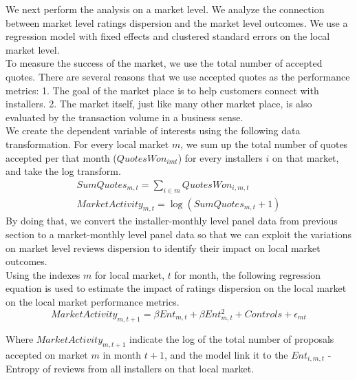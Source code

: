 \documentclass[msom,blindrev]{informs3}
\begin{document}
We next perform the analysis on a market level. We analyze the connection between market level ratings dispersion and the market level outcomes.  We use a regression model with fixed effects and clustered standard errors on the local market level. \\
To measure the success of the market, we use the total number of accepted quotes. There are several reasons that we use accepted quotes as the performance metrics: 1. The goal of the market place is to help customers connect with installers. 2. The market itself, just like many other market place, is also evaluated by the transaction volume in a business sense. \\
We create the dependent variable of interests using the following data transformation. For every local market $m$, we sum up the total number of quotes accepted per that month ($QuotesWon_{imt}$) for every installers $i$ on that market, and take the log transform.
\begin{align*}
SumQuotes_{m,t}=\sum_{i\in m} QuotesWon_{i,m,t}\\
MarketActivity_{m,t}=\log (SumQuotes_{m,t}+1)
\end{align*}
By doing that, we convert the installer-monthly level panel data from previous section to a market-monthly level panel data so that we can exploit the variations on market level reviews dispersion to identify their impact on local market outcomes.  \\
Using the indexes $m$ for local market, $t$ for month, the following regression equation is used to estimate the impact of ratings dispersion on the local market on the local market performance metrics.
\begin{equation}
    MarketActivity_{m,t+1}=\beta Ent_{m,t}+\beta Ent_{m,t}^2+Controls+\epsilon_{mt}
\end{equation}

Where $MarketActivity_{m,t+1}$ indicate the log of the total number of proposals accepted on market $m$ in month $t+1$, and the model link it to the $Ent_{i,m,t}$ - Entropy of reviews from all installers on that local market.
\end{document}
